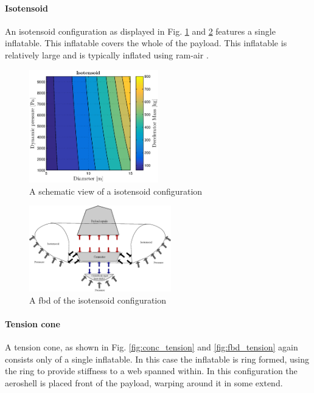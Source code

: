 \paragraph{Isotensoid}

An isotensoid configuration as displayed in Fig. \ref{fig:conc_iso} and \ref{fig:fbd_iso} features a single inflatable. This inflatable covers the whole of the payload. This inflatable is relatively large and is typically inflated using ram-air \cite{Smith2011}. 

\begin{figure}[H]
\centering
\includegraphics[width = 0.5\textwidth]{Figure/ISO_comp.eps}
\caption{A schematic view of a isotensoid configuration}
\label{fig:conc_iso}
\end{figure}

\begin{figure}[H]
\centering
\includegraphics[width = 0.55\textwidth]{Figure/FBD_isotensoid.eps}
\caption{A \gls{fbd} of the isotensoid configuration}
\label{fig:fbd_iso}
\end{figure}

\paragraph{Tension cone}

A tension cone, as shown in Fig. \ref{fig:conc_tension} and \ref{fig:fbd_tension}  again consists only of a single inflatable. In this case the inflatable is ring formed, using the ring to provide stiffness to a web spanned within. In this configuration the aeroshell is placed front of the payload, warping around it in some extend.

